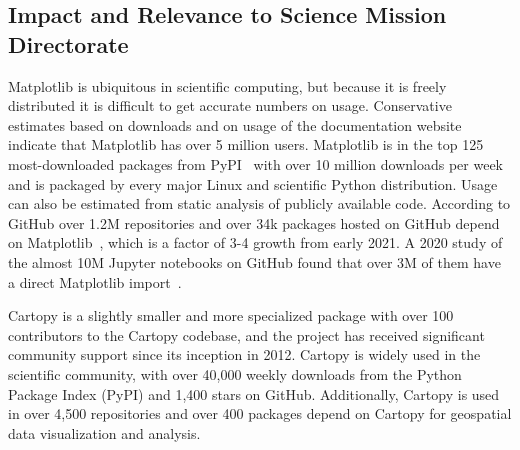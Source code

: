 \documentclass[12pt]{article}
\numberwithin{page}{section}
\begin{document}


%
%
%





\subsection{Impact and Relevance to Science Mission Directorate}

Matplotlib is ubiquitous in scientific computing, but because it is freely
distributed it is difficult to get accurate numbers on usage.  Conservative
estimates based on downloads and on usage of the documentation website indicate
that Matplotlib has over 5 million users.  Matplotlib is in the top 125
most-downloaded packages from PyPI~\cite{pypi_stats} with over 10 million
downloads per week and is packaged by every major Linux and scientific Python
distribution.  Usage can also be estimated from static analysis of publicly
available code.  According to GitHub over 1.2M repositories and over 34k
packages hosted on GitHub depend on Matplotlib~\cite{gh_deps:2024},  which is a
factor of 3-4 growth from early 2021. A 2020 study of the almost 10M Jupyter
notebooks on GitHub found that over 3M of them have a direct Matplotlib
import~\cite{datalore:2020}.

Cartopy is a slightly smaller and more specialized package with over 100 contributors
to the Cartopy codebase, and the project has received
significant community support since its inception in 2012. Cartopy is widely used in the
scientific community, with over 40,000 weekly downloads from the Python Package Index (PyPI)
and 1,400 stars on GitHub. Additionally, Cartopy is used in over 4,500 repositories and
over 400 packages depend on Cartopy for geospatial data visualization and analysis.
\end{document}
